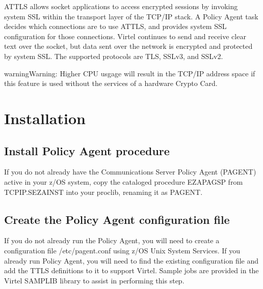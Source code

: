 \documentclass[letterpaper,10pt,english]{sphinxmanual}
\begin{document}
\sphinxAtStartPar
AT\sphinxhyphen{}TLS allows socket applications to access encrypted sessions by invoking system SSL within the transport layer of the TCP/IP stack. A Policy Agent task decides which connections are to use AT\sphinxhyphen{}TLS, and provides system SSL configuration for those connections. Virtel continues to send and receive clear text over the socket, but data sent over the network is encrypted and protected by system SSL. The supported protocols are TLS, SSLv3, and SSLv2.

\begin{sphinxadmonition}{warning}{Warning:}
\sphinxAtStartPar
Higher CPU usgage will result in the TCP/IP address space if this feature is used without the services of a hardware Crypto Card.
\end{sphinxadmonition}

\ignorespaces 

\section{Installation}
\label{\detokenize{connectivity_guide:installation}}\label{\detokenize{connectivity_guide:index-157}}

\subsection{Install Policy Agent procedure}
\label{\detokenize{connectivity_guide:install-policy-agent-procedure}}
\sphinxAtStartPar
If you do not already have the Communications Server Policy Agent (PAGENT) active in your z/OS system, copy the cataloged procedure EZAPAGSP from TCPIP.SEZAINST into your proclib, renaming it as PAGENT.


\subsection{Create the Policy Agent configuration file}
\label{\detokenize{connectivity_guide:create-the-policy-agent-configuration-file}}
\sphinxAtStartPar
If you do not already run the Policy Agent, you will need to create a configuration file /etc/pagent.conf using z/OS Unix System Services. If you already run Policy Agent, you will need to find the existing configuration file and add the TTLS definitions to it to support Virtel. Sample jobs are provided in the Virtel SAMPLIB library to assist in performing this step.
\end{document}
